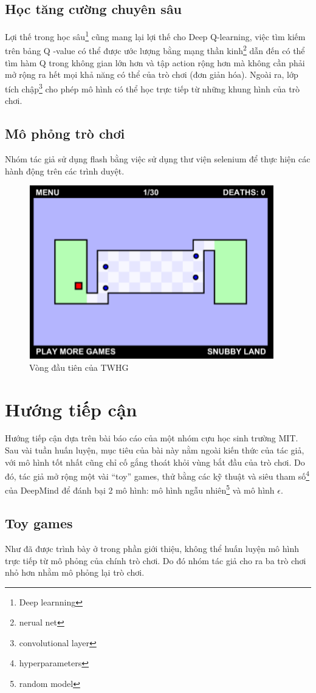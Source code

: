 \documentclass[12pt,a4paper]{article}
\begin{document}
\subsection{Học tăng cường chuyên sâu}
Lợi thế trong học sâu\footnote{Deep learnning} cũng mang lại lợi thế cho Deep Q-learning, việc tìm kiếm trên bảng Q -value có thể được ước lượng bằng mạng thần kinh\footnote{nerual net} dẫn đến có thể tìm hàm Q trong không gian lớn hơn và tập action rộng hơn mà không cần phải mở rộng ra hết mọi khả năng có thể của trò chơi (đơn giản hóa). Ngoài ra, lớp tích chập\footnote{convolutional layer} cho phép mô hình có thể học trực tiếp từ những khung hình của trò chơi.
\subsection{Mô phỏng trò chơi}
Nhóm tác giả sử dụng flash bằng việc sử dụng thư viện selenium để thực hiện các hành động trên các trình duyệt.
\begin{figure}[h]
    \centering
    \includegraphics{photo/lv1game.png}
    \caption{Vòng đầu tiên của TWHG}
    \label{fig:my_label}
\end{figure}
\section{Hướng tiếp cận}
Hướng tiếp cận dựa trên bài báo cáo của một nhóm cựu học sinh trường MIT. Sau vài tuần huấn luyện, mục tiêu của bài này nằm ngoài kiến thức của tác giả, với mô hình tốt nhất cũng chỉ cố gắng thoát khỏi vùng bắt đầu của trò chơi. Do đó, tác giả mở rộng một vài “toy” games, thử bằng các kỹ thuật và siêu tham số\footnote{hyperparameters} của DeepMind để đánh bại 2 mô hình: mô hình ngẫu nhiên\footnote{random model} và  mô hình  $\epsilon$.\\
\subsection{Toy games}
Như đã được trình bày ở trong phần giới thiệu, không thể huấn luyện mô hình trực tiếp từ mô phỏng của chính trò chơi. Do đó nhóm tác giả cho ra ba trò chơi nhỏ hơn nhằm mô phỏng lại trò chơi.
\end{document}

